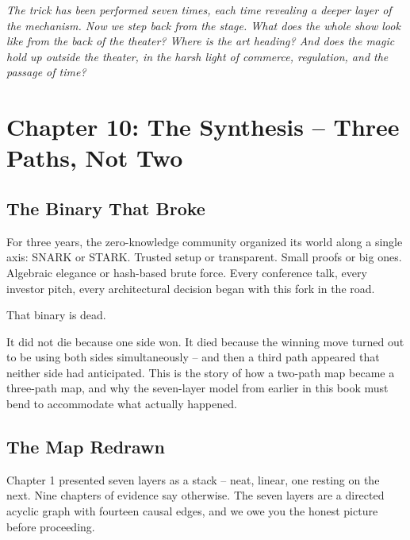 \documentclass[
  11pt,
  openany]{report}
\begin{document}
\emph{The trick has been performed seven times, each time revealing a deeper
layer of the mechanism. Now we step back from the stage. What does the whole
show look like from the back of the theater? Where is the art heading? And does
the magic hold up outside the theater, in the harsh light of commerce,
regulation, and the passage of time?}

\chapter{Chapter 10: The Synthesis -- Three Paths, Not
Two}\label{chapter-10-the-synthesis-three-paths-not-two}

\section{The Binary That Broke}\label{the-binary-that-broke}

For three years, the zero-knowledge community organized its world along a single
axis: SNARK or STARK. Trusted setup or transparent. Small proofs or big ones.
Algebraic elegance or hash-based brute force. Every conference talk, every
investor pitch, every architectural decision began with this fork in the road.

That binary is dead.

It did not die because one side won. It died because the winning move turned out
to be using both sides simultaneously -- and then a third path appeared that
neither side had anticipated. This is the story of how a two-path map became a
three-path map, and why the seven-layer model from earlier in this book must
bend to accommodate what actually happened.

\section{The Map Redrawn}\label{the-map-redrawn}

Chapter 1 presented seven layers as a stack -- neat, linear, one resting on the
next. Nine chapters of evidence say otherwise. The seven layers are a directed
acyclic graph with fourteen causal edges, and we owe you the honest picture
before proceeding.
\end{document}
